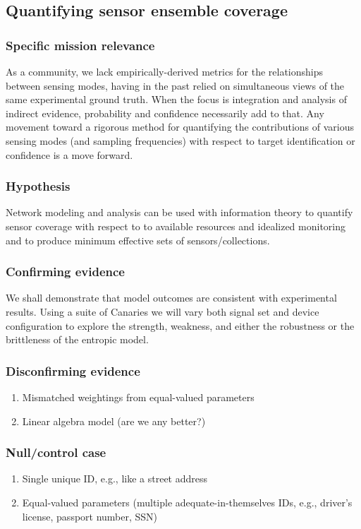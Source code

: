 \documentclass{article} %
\begin{document}
\pagebreak
\subsection{Quantifying sensor ensemble coverage}
\subsubsection{Specific mission relevance}
As a community, we lack empirically-derived metrics for the relationships between sensing modes, having in the past relied on simultaneous views of the same experimental ground truth. When the focus is integration and analysis of indirect evidence, probability and confidence necessarily add to that. Any movement toward a rigorous method for quantifying the contributions of various sensing modes (and sampling frequencies) with respect to target identification or confidence is a move forward.

\subsubsection{Hypothesis}
Network modeling and analysis can be used with information theory to quantify sensor coverage with respect to to available resources and idealized monitoring and to produce minimum effective sets of sensors/collections.

\subsubsection{Confirming evidence}
We shall demonstrate that model outcomes are consistent with experimental results. Using a suite of Canaries we will vary both signal set and device configuration to explore the strength, weakness, and either the robustness or the brittleness of the entropic model. 

\subsubsection{Disconfirming evidence}
\begin{enumerate}
\item Mismatched weightings from equal-valued parameters
\item Linear algebra model (are we any better?)
\end{enumerate}

\subsubsection{Null/control case}
\begin{enumerate}
\item Single unique ID, e.g., like a street address
\item Equal-valued parameters (multiple adequate-in-themselves IDs, e.g., driver's license, passport number, SSN)
\end{enumerate}
\end{document}
